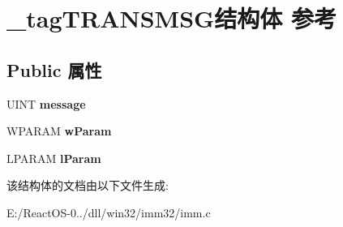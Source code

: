 \hypertarget{struct__tag_t_r_a_n_s_m_s_g}{}\section{\+\_\+tag\+T\+R\+A\+N\+S\+M\+S\+G结构体 参考}
\label{struct__tag_t_r_a_n_s_m_s_g}
\subsection*{Public 属性}
\begin{DoxyCompactItemize}
\item 
\mbox{\label{struct__tag_t_r_a_n_s_m_s_g_a920a2a2df7a3ec1b805fe8145679957b}} 
U\+I\+NT {\bfseries message}
\item 
\mbox{\label{struct__tag_t_r_a_n_s_m_s_g_a91d876aca8537f72a31eb287b7377dc6}} 
W\+P\+A\+R\+AM {\bfseries w\+Param}
\item 
\mbox{\label{struct__tag_t_r_a_n_s_m_s_g_a5a4d3c4a3426a2ec0f50762dc94714ef}} 
L\+P\+A\+R\+AM {\bfseries l\+Param}
\end{DoxyCompactItemize}


该结构体的文档由以下文件生成\+:\begin{DoxyCompactItemize}
\item 
E\+:/\+React\+O\+S-\/0../dll/win32/imm32/imm.\+c\end{DoxyCompactItemize}
